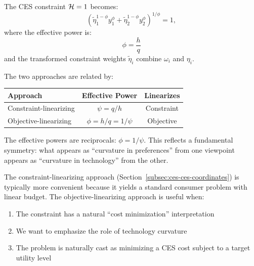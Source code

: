 \begin{proposition}
\label{prop:transformed-constraint}
The CES constraint $\mathcal{H} = 1$ becomes:
\begin{equation}
\label{eq:ces-constraint-transformed}
\left( \tilde{\eta}_1^{1-\phi} y_1^{\phi} + \tilde{\eta}_2^{1-\phi} y_2^{\phi} \right)^{1/\phi} = 1,
\end{equation}
where the effective power is:
\begin{equation}
\boxed{\phi = \frac{h}{q}}
\end{equation}
and the transformed constraint weights $\tilde{\eta}_i$ combine $\omega_i$ and $\eta_i$.
\end{proposition}

\begin{calloutimportant}
The two approaches are related by:
\begin{center}
\begin{tabular}{lcc}
\toprule
\textbf{Approach} & \textbf{Effective Power} & \textbf{Linearizes} \\
\midrule
Constraint-linearizing & $\psi = q/h$ & Constraint \\
Objective-linearizing & $\phi = h/q = 1/\psi$ & Objective \\
\bottomrule
\end{tabular}
\end{center}
The effective powers are reciprocals: $\phi = 1/\psi$. This reflects a fundamental symmetry: what appears as ``curvature in preferences'' from one viewpoint appears as ``curvature in technology'' from the other.
\end{calloutimportant}

\begin{remark}
The constraint-linearizing approach (Section~\ref{subsec:ces-ces-coordinates}) is typically more convenient because it yields a standard consumer problem with linear budget. The objective-linearizing approach is useful when:
\begin{enumerate}[label=(\roman*)]
    \item The constraint has a natural ``cost minimization'' interpretation
    \item We want to emphasize the role of technology curvature
    \item The problem is naturally cast as minimizing a CES cost subject to a target utility level
\end{enumerate}
\end{remark}

